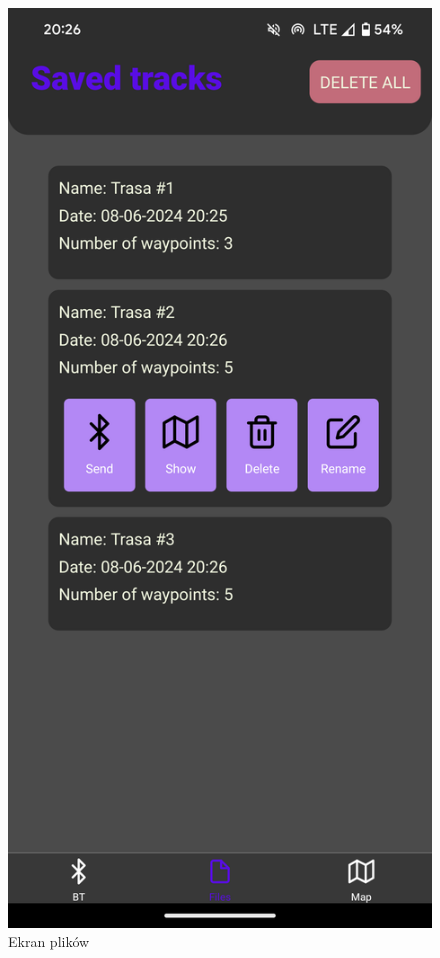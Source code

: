 \begin{figure}[H]
    \centering
    \includegraphics[scale = 0.07]{res/Files.png}
    \caption{Ekran plików}
\end{figure}

